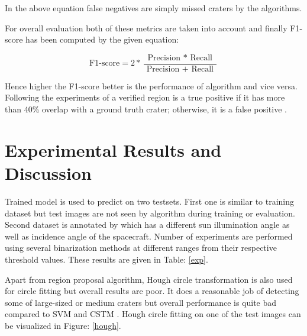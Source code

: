 \documentclass[11pt]{article}
\begin{document}
In the above equation false negatives are simply missed craters by the algorithms.

For overall evaluation both of these metrics are taken into account and finally F1-score has been computed by the given equation:

\begin{equation*}
\text{F1-score} =2 * \frac{\text { Precision } * \text { Recall }}{\text { Precision }+\text { Recall }}
\end{equation*}

Hence higher the F1-score better is the performance of algorithm and vice versa. Following the experiments of \cite{emami2015automatic} a verified region is a true positive if it has more than 40\% overlap with a ground truth crater; otherwise, it is a false positive .

\section{Experimental Results and Discussion}
Trained model is used to predict on two testsets. First one is similar to training dataset but test images are not seen by algorithm during training or evaluation. Second dataset is annotated by \cite{dino2020} which has a different sun illumination angle as well as incidence angle of the spacecraft. Number of experiments are performed using several binarization methods at different ranges from their respective threshold values. These results are given in Table: \ref{exp}.

Apart from region proposal algorithm, Hough circle transformation is also used for circle fitting but overall results are poor. It does a reasonable job of detecting some of large-sized or medium craters but overall performance is quite bad compared to SVM and CSTM \cite{wetzler2005learning}. Hough circle fitting on one of the test images can be visualized in Figure: \ref{hough}.
\end{document}
